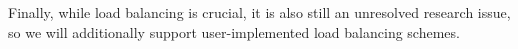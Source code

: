 \documentclass[11pt,letterpaper]{article}
\begin{document}
%
% 
Finally, while load balancing is crucial, it is also still an
unresolved research issue, so we will additionally support
user-implemented load balancing schemes.
\end{document}
